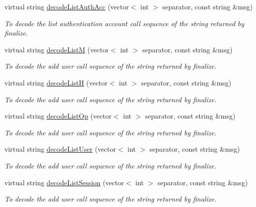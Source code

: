 \begin{DoxyCompactItemize}
virtual string \hyperlink{classUMSMapper_aa4cf98be3bbb9f06b886cf9271c26775}{decodeListAuthAcc} (vector$<$ int $>$ separator, const string \&msg)
\begin{DoxyCompactList}\small\item\em To decode the list authentication account call sequence of the string returned by finalize. \item\end{DoxyCompactList}\item 
virtual string \hyperlink{classUMSMapper_af1a5337f43f288ba2f922f9876b8e0f8}{decodeListM} (vector$<$ int $>$ separator, const string \&msg)
\begin{DoxyCompactList}\small\item\em To decode the add user call sequence of the string returned by finalize. \item\end{DoxyCompactList}\item 
virtual string \hyperlink{classUMSMapper_a54ef53fc918cfacdeda213fafdcc76de}{decodeListH} (vector$<$ int $>$ separator, const string \&msg)
\begin{DoxyCompactList}\small\item\em To decode the add user call sequence of the string returned by finalize. \item\end{DoxyCompactList}\item 
virtual string \hyperlink{classUMSMapper_a72267ca71cc620570a238dfec3f0519f}{decodeListOp} (vector$<$ int $>$ separator, const string \&msg)
\begin{DoxyCompactList}\small\item\em To decode the add user call sequence of the string returned by finalize. \item\end{DoxyCompactList}\item 
virtual string \hyperlink{classUMSMapper_a569b2de623104e451711ff14b1f8f84f}{decodeListUser} (vector$<$ int $>$ separator, const string \&msg)
\begin{DoxyCompactList}\small\item\em To decode the add user call sequence of the string returned by finalize. \item\end{DoxyCompactList}\item 
virtual string \hyperlink{classUMSMapper_a750e6d307c48491a86a97d694807ca66}{decodeListSession} (vector$<$ int $>$ separator, const string \&msg)
\begin{DoxyCompactList}\small\item\em To decode the add user call sequence of the string returned by finalize. \item\end{DoxyCompactList}\item 

\end{DoxyCompactItemize}
